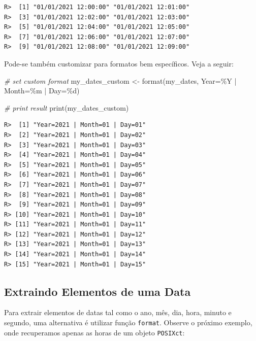 \documentclass[
  11pt,
]{book}
\newenvironment{Shaded}{\begin{snugshade}}{\end{snugshade}}
\newcommand{\CommentTok}[1]{\textcolor[rgb]{0.37,0.37,0.37}{\textit{#1}}}
\newcommand{\FunctionTok}[1]{\textcolor[rgb]{0,0,0}{#1}}
\newcommand{\NormalTok}[1]{#1}
\newcommand{\OtherTok}[1]{\textcolor[rgb]{0.37,0.37,0.37}{#1}}
\newcommand{\StringTok}[1]{\textcolor[rgb]{0.5,0.5,0.5}{#1}}
\begin{document}
\begin{verbatim}
R>  [1] "01/01/2021 12:00:00" "01/01/2021 12:01:00"
R>  [3] "01/01/2021 12:02:00" "01/01/2021 12:03:00"
R>  [5] "01/01/2021 12:04:00" "01/01/2021 12:05:00"
R>  [7] "01/01/2021 12:06:00" "01/01/2021 12:07:00"
R>  [9] "01/01/2021 12:08:00" "01/01/2021 12:09:00"
\end{verbatim}

Pode-se também customizar para formatos bem específicos. Veja a seguir:

\begin{Shaded}
\begin{Highlighting}[]
\CommentTok{\# set custom format}
\NormalTok{my\_dates\_custom }\OtherTok{\textless{}{-}} \FunctionTok{format}\NormalTok{(my\_dates,}
                          \StringTok{\textquotesingle{}Year=\%Y | Month=\%m | Day=\%d\textquotesingle{}}\NormalTok{)}

\CommentTok{\# print result}
\FunctionTok{print}\NormalTok{(my\_dates\_custom)}
\end{Highlighting}
\end{Shaded}

\begin{verbatim}
R>  [1] "Year=2021 | Month=01 | Day=01"
R>  [2] "Year=2021 | Month=01 | Day=02"
R>  [3] "Year=2021 | Month=01 | Day=03"
R>  [4] "Year=2021 | Month=01 | Day=04"
R>  [5] "Year=2021 | Month=01 | Day=05"
R>  [6] "Year=2021 | Month=01 | Day=06"
R>  [7] "Year=2021 | Month=01 | Day=07"
R>  [8] "Year=2021 | Month=01 | Day=08"
R>  [9] "Year=2021 | Month=01 | Day=09"
R> [10] "Year=2021 | Month=01 | Day=10"
R> [11] "Year=2021 | Month=01 | Day=11"
R> [12] "Year=2021 | Month=01 | Day=12"
R> [13] "Year=2021 | Month=01 | Day=13"
R> [14] "Year=2021 | Month=01 | Day=14"
R> [15] "Year=2021 | Month=01 | Day=15"
\end{verbatim}

\hypertarget{extraindo-elementos-de-uma-data}{%
\subsection{Extraindo Elementos de uma Data}\label{extraindo-elementos-de-uma-data}}

Para extrair elementos de datas tal como o ano, mês, dia, hora, minuto e segundo, uma alternativa é utilizar função \texttt{format}. Observe o próximo exemplo, onde recuperamos apenas as horas de um objeto \texttt{POSIXct}: 
\end{document}
